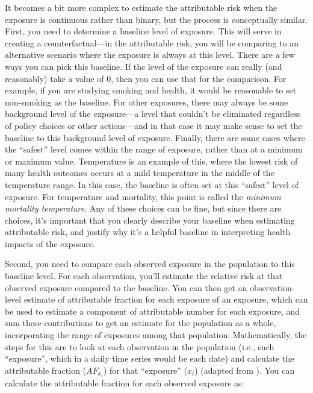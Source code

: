 \documentclass[
]{book}
\begin{document}
It becomes a bit more complex to estimate the attributable risk when the exposure is continuous rather than binary, but the process is conceptually similar. First, you need to determine a baseline level of exposure. This will serve in creating a counterfactual---in the attributable risk, you will be comparing to an alternative scenario where the exposure is always at this level. There are a few ways you can pick this baseline. If the level of the exposure can really (and reasonably) take a value of 0, then you can use that for the comparison. For example, if you are studying smoking and health, it would be reasonable to set non-smoking as the baseline. For other exposures, there may always be some background level of the exposure---a level that couldn't be eliminated regardless of policy choices or other actions---and in that case it may make sense to set the baseline to this background level of exposure. Finally, there are some cases where the ``safest'' level comes within the range of exposure, rather than at a minimum or maximum value. Temperature is an example of this, where the lowest risk of many health outcomes occurs at a mild temperature in the middle of the temperature range. In this case, the baseline is often set at this ``safest'' level of exposure. For temperature and mortality, this point is called the \emph{minimum mortality temperature}. Any of these choices can be fine, but since there are choices, it's important that you clearly describe your baseline when estimating attributable risk, and justify why it's a helpful baseline in interpreting health impacts of the exposure.

Second, you need to compare each observed exposure in the population to this baseline level. For each observation, you'll estimate the relative risk at that observed exposure compared to the baseline. You can then get an observation-level estimate of attributable fraction for each exposure of an exposure, which can be used to estimate a component of attributable number for each exposure, and sum these contributions to get an estimate for the population as a whole, incorporating the range of exposures among that population. Mathematically, the steps for this are to look at each observation in the population (i.e., each ``exposure'', which in a daily time series would be each date) and calculate the attributable fraction (\(AF_{x_i}\)) for that ``exposure'' (\(x_i\)) (adapted from \citet{gasparrini2014attributable}). You can calculate the attributable fraction for each observed exposure as:
\end{document}
